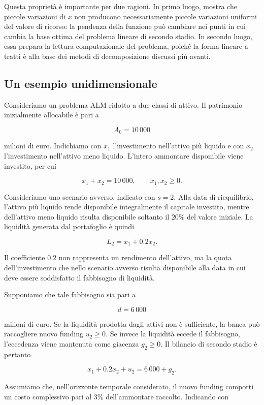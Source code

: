 Questa propriet\`a \`e importante per due ragioni. In primo luogo, mostra che
piccole variazioni di $x$ non producono necessariamente piccole variazioni
uniformi del valore di ricorso: la pendenza della funzione pu\`o cambiare nei
punti in cui cambia la base ottima del problema lineare di secondo stadio. In
secondo luogo, essa prepara la lettura computazionale del problema, poich\'e la
forma lineare a tratti \`e alla base dei metodi di decomposizione discussi pi\`u
avanti.

\subsection{Un esempio unidimensionale}

Consideriamo un problema ALM ridotto a due classi di attivo. Il patrimonio
inizialmente allocabile \`e pari a

\[
A_0=10\,000
\]

milioni di euro. Indichiamo con $x_1$ l'investimento nell'attivo pi\`u
liquido e con $x_2$ l'investimento nell'attivo meno liquido. L'intero
ammontare disponibile viene investito, per cui

\[
x_1+x_2=10\,000,
\qquad
x_1,x_2\geq0.
\]

Consideriamo uno scenario avverso, indicato con $s=2$. Alla data di
riequilibrio, l'attivo pi\`u liquido rende disponibile integralmente il
capitale investito, mentre dell'attivo meno liquido risulta disponibile
soltanto il $20\%$ del valore iniziale. La liquidit\`a generata dal
portafoglio \`e quindi

\[
L_2=x_1+0.2x_2.
\]

Il coefficiente $0.2$ non rappresenta un rendimento dell'attivo, ma la quota
dell'investimento che nello scenario avverso risulta disponibile alla data
in cui deve essere soddisfatto il fabbisogno di liquidit\`a.

Supponiamo che tale fabbisogno sia pari a

\[
d=6\,000
\]

milioni di euro. Se la liquidit\`a prodotta dagli attivi non \`e sufficiente,
la banca pu\`o raccogliere nuovo funding $u_2\geq0$. Se invece la liquidit\`a
eccede il fabbisogno, l'eccedenza viene mantenuta come giacenza
$g_2\geq0$. Il bilancio di secondo stadio \`e pertanto

\[
x_1+0.2x_2+u_2
=
6\,000+g_2.
\]

Assumiamo che, nell'orizzonte temporale considerato, il nuovo funding comporti
un costo complessivo pari al $3\%$ dell'ammontare raccolto. Indicando con


